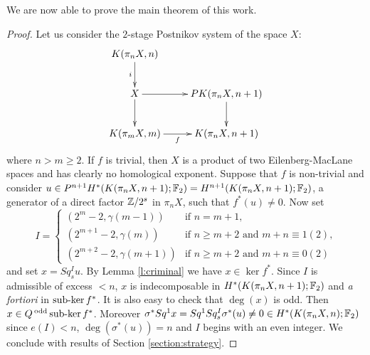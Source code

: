 We are now able to prove the main theorem of this work.

\begin{thm_first_main}

\end{thm_first_main}

\begin{proof} %
Let us consider the $2$-stage Postnikov system of the space $X$:
$$\xymatrix{
K(\pi_nX,n)\ar[d]_i\\
X\ar[d]\ar[r] &PK(\pi_nX,n+1)\ar[d]\\
K(\pi_mX,m)\ar[r]_-f &K(\pi_nX,n+1)
}$$ where $n>m\geq2$.
If $f$ is trivial, then $X$ is a product of two Eilenberg-MacLane spaces and has clearly no homological exponent. Suppose that $f$ is non-trivial and consider $u\in P^{n+1}H^*(K(\pi_nX,n+1);\mathbb{F}_2)=H^{n+1}(K(\pi_nX,n+1);\mathbb{F}_2)$, a generator of a direct factor $\mathbb{Z}/2^s$ in $\pi_nX$, such that $f^*(u)\not=0$. Now set
$$
I=\begin{cases}
(2^{m}-2,\gamma(m-1)) &\text{if $n=m+1$,}\\
(2^{m+1}-2,\gamma(m)) &\text{if $n\geq m+2$ and $m+n\equiv1(2)$,}\\
(2^{m+2}-2,\gamma(m+1)) &\text{if $n\geq m+2$ and $m+n\equiv0(2)$}
\end{cases}
$$ and set $x=Sq^I_s u$. By Lemma \ref{l:criminal} we have $x\in\ker f^*$. Since $I$ is admissible of excess $<n$, $x$ is indecomposable in $H^*(K(\pi_nX,n+1);\mathbb{F}_2)$ and {\it a fortiori} in $\operatorname{sub-ker} f^*$. It is also easy to check that $\deg(x)$ is odd. Then $x\in Q\operatorname{^{odd}}\operatorname{sub-ker} f^*$. Moreover $\sigma^*Sq^1x=Sq^1Sq^I_s\sigma^*(u)\not=0\in H^*(K(\pi_nX,n);\mathbb{F}_2)$ since $e(I)<n$, $\deg(\sigma^*(u))=n$ and $I$ begins with an even integer. We conclude with results of Section \ref{section:strategy}.
\end{proof}

\endinput